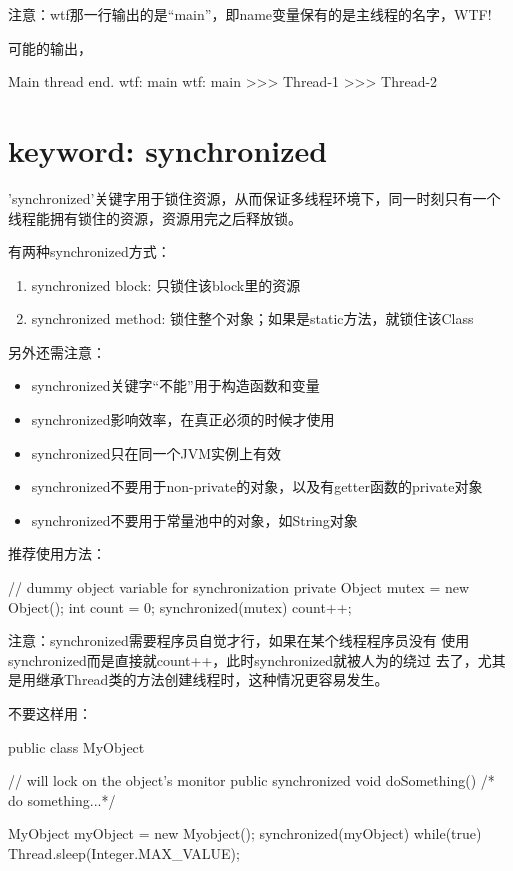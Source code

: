 \documentclass[a4paper,11pt]{article}
\begin{document}
注意：wtf那一行输出的是“main”，即name变量保有的是主线程的名字，WTF!

可能的输出，

\begin{bashcode}
Main thread end.
wtf: main
wtf: main
>>> Thread-1
>>> Thread-2
\end{bashcode}

\section[keyword: synchronized]{keyword: synchronized}
'synchronized'关键字用于锁住资源，从而保证多线程环境下，同一时刻只有一个
线程能拥有锁住的资源，资源用完之后释放锁。

有两种synchronized方式：
\begin{enumerate}
\item synchronized block: 只锁住该block里的资源
\item synchronized method: 锁住整个对象；如果是static方法，就锁住该Class
\end{enumerate}
另外还需注意：
\begin{itemize}
\item synchronized关键字“不能”用于构造函数和变量
\item synchronized影响效率，在真正必须的时候才使用
\item synchronized只在同一个JVM实例上有效
\item synchronized不要用于non-private的对象，以及有getter函数的private对象
\item synchronized不要用于常量池中的对象，如String对象
\end{itemize}
推荐使用方法：\\
\begin{javacode}
// dummy object variable for synchronization
private Object mutex = new Object();
int count = 0;
synchronized(mutex) {
    count++;
}
\end{javacode}

注意：synchronized需要程序员自觉才行，如果在某个线程程序员没有
使用synchronized而是直接就count++，此时synchronized就被人为的绕过
去了，尤其是用继承Thread类的方法创建线程时，这种情况更容易发生。

不要这样用：\\
\begin{javacode}
public class MyObject {
    // will lock on the object's monitor
    public synchronized void doSomething() { /* do something...*/ }

    MyObject myObject = new Myobject();
    synchronized(myObject) {
        while(true) {
            Thread.sleep(Integer.MAX_VALUE);
        }
    }
}
\end{javacode}
\end{document}
